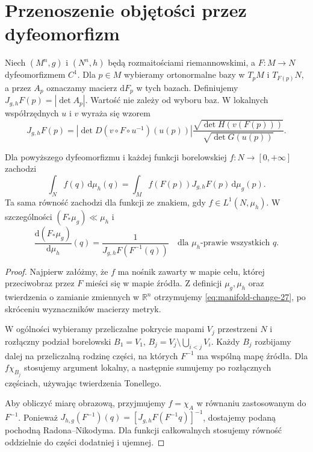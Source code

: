 \section{Przenoszenie objętości przez dyfeomorfizm}
\begin{definicja}
\label{def:volume-jacobian-27}
Niech $(M^n,g)$ i $(N^n,h)$ będą rozmaitościami
riemannowskimi, a $F:M\to N$ dyfeomorfizmem $C^1$.
Dla $p\in M$ wybieramy ortonormalne bazy
w $T_pM$ i $T_{F(p)}N$, a przez $A_p$ oznaczamy
macierz $\mathrm dF_p$ w tych bazach. Definiujemy
$J_{g,h}F(p)=|\det A_p|$. Wartość nie zależy
od wyboru baz. W lokalnych współrzędnych $u$ i $v$
wyraża się wzorem
\[
 J_{g,h}F(p)=|\det D(v\circ F\circ u^{-1})(u(p))|
 \frac{\sqrt{\det H(v(F(p)))}}{\sqrt{\det G(u(p))}}.
\]
\end{definicja}

\begin{twierdzenie}
\label{thm:manifold-change-27}
Dla powyższego dyfeomorfizmu i każdej funkcji
borelowskiej $f:N\to[0,+\infty]$ zachodzi
\begin{equation}\label{eq:manifold-change-27}
 \int_N f(q)\,\mathrm d\mu_h(q)=
 \int_M f(F(p))J_{g,h}F(p)\,\mathrm d\mu_g(p).
\end{equation}
Ta sama równość zachodzi dla funkcji ze znakiem,
gdy $f\in L^1(N,\mu_h)$.
W szczególności $(F_*\mu_g)\ll\mu_h$ i
\[
 \frac{\mathrm d(F_*\mu_g)}{\mathrm d\mu_h}(q)
 =\frac{1}{J_{g,h}F(F^{-1}(q))}
 \quad\text{dla }\mu_h\text{-prawie wszystkich }q.
\]
\end{twierdzenie}
\begin{proof}
Najpierw załóżmy, że $f$ ma nośnik zawarty
w mapie celu, której przeciwobraz przez $F$
mieści się w mapie źródła. Z definicji
$\mu_g,\mu_h$ oraz twierdzenia o zamianie
zmiennych w $\mathbb R^n$ otrzymujemy
\eqref{eq:manifold-change-27}, po skróceniu
wyznaczników macierzy metryk.

W ogólności wybieramy przeliczalne pokrycie
mapami $V_j$ przestrzeni $N$ i rozłączny podział
borelowski $B_1=V_1$, $B_j=V_j\setminus
\bigcup_{i<j}V_i$. Każdy $B_j$ rozbijamy dalej
na przeliczalną rodzinę części, na których
$F^{-1}$ ma wspólną mapę źródła. Dla
$f\chi_{B_j}$ stosujemy argument lokalny,
a następnie sumujemy po rozłącznych częściach,
używając twierdzenia Tonellego.

Aby obliczyć miarę obrazową, przyjmujemy
$f=\chi_A$ w równaniu zastosowanym do $F^{-1}$.
Ponieważ
$J_{h,g}(F^{-1})(q)=[J_{g,h}F(F^{-1}q)]^{-1}$,
dostajemy podaną pochodną Radona--Nikodyma.
Dla funkcji całkowalnych stosujemy równość
oddzielnie do części dodatniej i ujemnej.
\end{proof}


